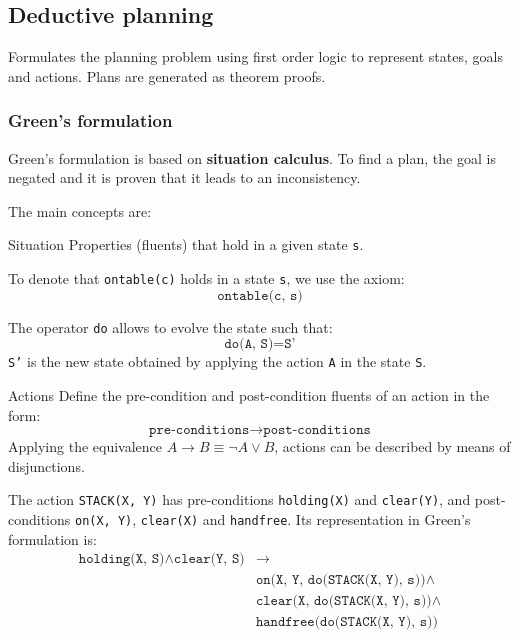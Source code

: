 \subsection{Deductive planning}
Formulates the planning problem using first order logic to represent states, goals and actions.
Plans are generated as theorem proofs.

\subsubsection{Green's formulation}
Green's formulation is based on \textbf{situation calculus}.
To find a plan, the goal is negated and it is proven that it leads to an inconsistency.

The main concepts are:
\begin{descriptionlist}
    \item[Situation]
        Properties (fluents) that hold in a given state \texttt{s}.
        \begin{example}
            To denote that \texttt{ontable(c)} holds in a state \texttt{s}, we use the axiom:
            \[ \texttt{ontable(c, s)} \]
        \end{example}
        The operator \texttt{do} allows to evolve the state such that:
        \[ \texttt{do(A, S)} = \texttt{S'} \]
        \texttt{S'} is the new state obtained by applying the action \texttt{A} in the state \texttt{S}.

    \item[Actions]
        Define the pre-condition and post-condition fluents of an action in the form:
        \[ \texttt{pre-conditions} \rightarrow \texttt{post-conditions} \]
        Applying the equivalence $A \rightarrow B \equiv \lnot A \vee B$, actions can be described by means of disjunctions.
        \begin{example}
            The action \texttt{STACK(X, Y)} has pre-conditions \texttt{holding(X)} and \texttt{clear(Y)}, and
            post-conditions \texttt{on(X, Y)}, \texttt{clear(X)} and \texttt{handfree}.
            Its representation in Green's formulation is:
            \[
                \begin{split}
                    \texttt{holding(X, S)} \land \texttt{clear(Y, S)} &\rightarrow \\
                    &\texttt{on(X, Y, do(STACK(X, Y), s))} \land \\
                    &\texttt{clear(X, do(STACK(X, Y), s))} \land \\
                    &\texttt{handfree(do(STACK(X, Y), s))} \\
                \end{split}
            \]
        \end{example}


\end{descriptionlist}
